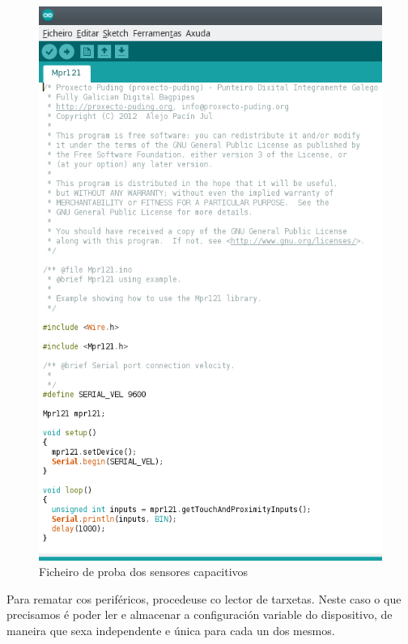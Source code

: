    \begin{figure}[htbp]
    \centering
    \includegraphics[scale=0.8,keepaspectratio=true]{./imagenes/test-sensores-capacitivos.png}
    \caption{Ficheiro de proba dos sensores capacitivos}
    \label{figura:TestSensoresCapacitivos}
   \end{figure}
   
   Para rematar cos periféricos, procedeuse co lector de tarxetas. Neste caso o
   que precisamos é poder ler e almacenar a configuración variable do
   dispositivo, de maneira que sexa independente e única para cada un dos
   mesmos. \\
   
